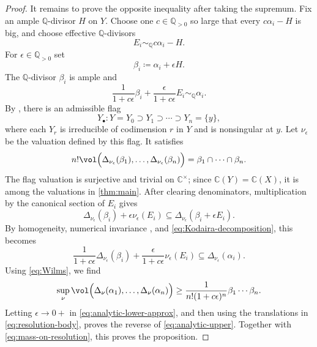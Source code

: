 \documentclass[11pt,a4paper]{amsart}
\begin{document}
\begin{proof}
It remains to prove the opposite inequality after taking the supremum. Fix an ample $\mathbb Q$-divisor $H$ on $Y$. Choose one
$c\in\mathbb Q_{>0}$ so large that every $c\alpha_i-H$ is big, and choose effective $\mathbb Q$-divisors
\[
 E_i\sim_{\mathbb Q}c\alpha_i-H.
\]
For $\epsilon\in\mathbb Q_{>0}$ set
\[
 \beta_i\coloneqq \alpha_i+\epsilon H.
\]
The $\mathbb Q$-divisor $\beta_i$ is ample and
\begin{equation}\label{eq:Kodaira-decomposition}
 \frac{1}{1+c\epsilon}\beta_i
 +\frac{\epsilon}{1+c\epsilon}E_i
 \sim_{\mathbb Q}\alpha_i.
\end{equation}
By \cite[Theorem~1.1]{Wil25}, there is an admissible flag
\[
 Y_\bullet\colon Y=Y_0\supset Y_1\supset\cdots\supset Y_n=\{y\},
\]
where each $Y_r$ is irreducible of codimension $r$ in $Y$ and is nonsingular at $y$.  Let $\nu_\epsilon$ be the valuation defined by this
flag.  It
satisfies
\begin{equation}\label{eq:Wilms}
 n!\vol\Bigl(\Delta_{\nu_\epsilon}(\beta_1),\ldots,\Delta_{\nu_\epsilon}(\beta_n)\Bigr)=\beta_1\cap \cdots \cap \beta_n.
\end{equation}
The flag valuation is surjective and trivial on $\mathbb C^\times$; since $\mathbb C(Y)=\mathbb C(X)$, it is among the valuations in \cref{thm:main}.  After clearing denominators, multiplication by the canonical section of $E_i$ gives
\[
 \Delta_{\nu_\epsilon}(\beta_i)
 +\epsilon\nu_\epsilon(E_i)
 \subseteq
 \Delta_{\nu_\epsilon}(\beta_i+\epsilon E_i).
\]
By homogeneity, numerical invariance
\cite[Proposition~10.3.2]{Xiabook}, and
\eqref{eq:Kodaira-decomposition}, this becomes
\[
 \frac{1}{1+c\epsilon}\Delta_{\nu_\epsilon}(\beta_i)+\frac{\epsilon}{1+c\epsilon}\nu_\epsilon(E_i)\subseteq\Delta_{\nu_\epsilon}(\alpha_i).
\]
Using \eqref{eq:Wilms}, we find
\begin{equation}\label{eq:analytic-lower-approx}
 \sup_\nu\vol\Bigl(\Delta_\nu(\alpha_1),\ldots,\Delta_\nu(\alpha_n)\Bigr)
 \geq\frac{1}{n!(1+c\epsilon)^n}\beta_1\cdots \beta_n.
\end{equation}
Letting $\epsilon\to 0+$ in \eqref{eq:analytic-lower-approx}, and then using the translations in \eqref{eq:resolution-body}, proves the reverse of \eqref{eq:analytic-upper}. Together with \eqref{eq:mass-on-resolution}, this proves the proposition.
\end{proof}
\end{document}
